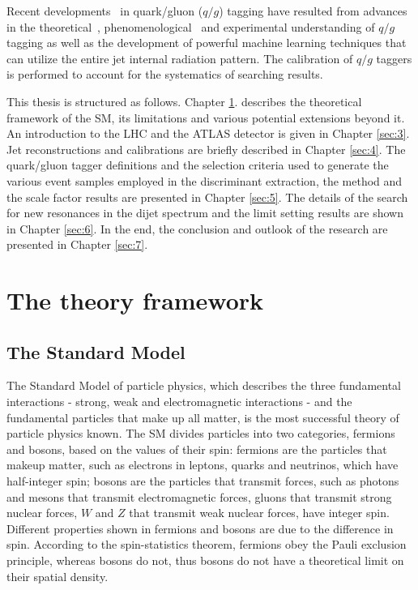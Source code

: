 \documentclass[UTF8,12pt]{ctexart}
\numberwithin{equation}{section}
\begin{document}
Recent developments~\cite{CMS:2021iwu,ref22,CMS:2017yer,CMS:2013kfv,CMS:2017pcy,PhysRevD.98.092014,CMS:2018vzn,Altheimer:2012mn,Andersen:2016qtm,Larkoski:2014pca,CDF:2005prv,OPAL:1999jkz,CLEO:2007tqf,DELPHI:1999gah,ZEUS:2004gcp,ref24,Komiske:2016rsd} in quark/gluon ($q/g$) tagging have resulted from advances in the theoretical~\cite{ref16}, phenomenological~\cite{ref17, ref18, Gras:2017jty, Komiske:2018vkc} and experimental understanding of $q/g$ tagging as well as the development of powerful machine learning techniques that can utilize the entire jet internal radiation pattern. The calibration of $q/g$ taggers is performed to account for the systematics of searching results. 


This thesis is structured as follows. Chapter \ref{sec:2}. describes the theoretical framework of the SM, its limitations and various potential extensions beyond it. An introduction to the LHC and the ATLAS detector is given in Chapter \ref{sec:3}. Jet reconstructions and calibrations are briefly described in Chapter \ref{sec:4}. The quark/gluon tagger definitions and the selection criteria used to generate the various event samples employed in the discriminant extraction, the method and the scale factor results are presented in Chapter \ref{sec:5}. The details of the search for new resonances in the dijet spectrum and the limit setting results are shown in Chapter \ref{sec:6}. In the end, the conclusion and outlook of the research are presented in Chapter \ref{sec:7}.




\newpage
{}
\section{The theory framework}
\label{sec:2}
\subsection{The Standard Model}
\label{sec:2.1}

The Standard Model of particle physics, which describes the three fundamental interactions - strong, weak and electromagnetic interactions - and the fundamental particles that make up all matter, is the most successful theory of particle physics known.
The SM divides particles into two categories, fermions and bosons, based on the values of their spin: fermions are the particles that makeup matter, such as electrons in leptons, quarks and neutrinos, which have half-integer spin; bosons are the particles that transmit forces, such as photons and mesons that transmit electromagnetic forces, gluons that transmit strong nuclear forces, $W$ and $Z$ that transmit weak nuclear forces, have integer spin.  Different properties shown in fermions and bosons are due to the difference in spin. According to the spin-statistics theorem, fermions obey the Pauli exclusion principle, whereas bosons do not, thus bosons do not have a theoretical limit on their spatial density.
\end{document}
